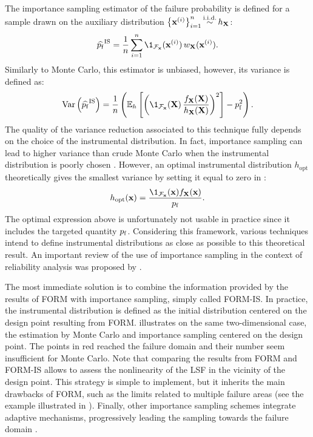 The importance sampling estimator of the failure probability is defined for a sample drawn on the auxiliary distribution $\left\{{\bf x}^{(i)}\right\}_{i=1}^n \mathop{\sim}\limits^{\mathrm{i.i.d.}} h_{\bf X}$: 
\begin{equation}
    \what{\pf}^{\mathrm{IS}} = \frac1n \sum_{i=1}^{n} \1_{\iF_\bx}(\bx^{(i)}) \, w_\bX(\bx^{(i)}).
    \label{eq:pf_IS}
\end{equation}
Similarly to Monte Carlo, this estimator is unbiased, however, its variance is defined as: 
\begin{equation}
    \var\left( \what{\pf}^{\mathrm{IS}}\right) = \frac1n \left( \E_{h}\left[\left(\1_{\iF_\bx}(\bX) \, \frac{f_\bX(\bX)}{h_\bX(\bX)}\right)^2\right] - \pf^2\right).
    \label{eq:IS_variance}
\end{equation}
The quality of the variance reduction associated to this technique fully depends on the choice of the instrumental distribution. 
In fact, importance sampling can lead to higher variance than crude Monte Carlo when the instrumental distribution is poorly chosen \citep{owen_zhou_2000_is}. 
However, an optimal instrumental distribution $h_{\mathrm{opt}}$ theoretically gives the smallest variance by setting it equal to zero in : 
\begin{equation}
    h_{\mathrm{opt}}(\bx) = \frac{\1_{\iF_\bx}(\bx) f_\bX(\bx)}{\pf}. 
\end{equation}
The optimal expression above is unfortunately not usable in practice since it includes the targeted quantity $p_\mathrm{f}$. 
Considering this framework, various techniques intend to define instrumental distributions as close as possible to this theoretical result. 
An important review of the use of importance sampling in the context of reliability analysis was proposed by \citet{tabandeh_2022_IS_review}. 

The most immediate solution is to combine the information provided by the results of FORM with importance sampling, simply called FORM-IS. 
In practice, the instrumental distribution is defined as the initial distribution centered on the design point resulting from FORM. 
 illustrates on the same two-dimensional case, the estimation by Monte Carlo and importance sampling centered on the design point. 
The points in red reached the failure domain and their number seem insufficient for Monte Carlo.  
Note that comparing the results from FORM and FORM-IS allows to assess the nonlinearity of the LSF in the vicinity of the design point.  
This strategy is simple to implement, but it inherits the main drawbacks of FORM, such as the limits related to multiple failure areas (see the example illustrated in ). 
Finally, other importance sampling schemes integrate adaptive mechanisms, progressively leading the sampling towards the failure domain \citep{bugallo_2017_AIS_review}.  



